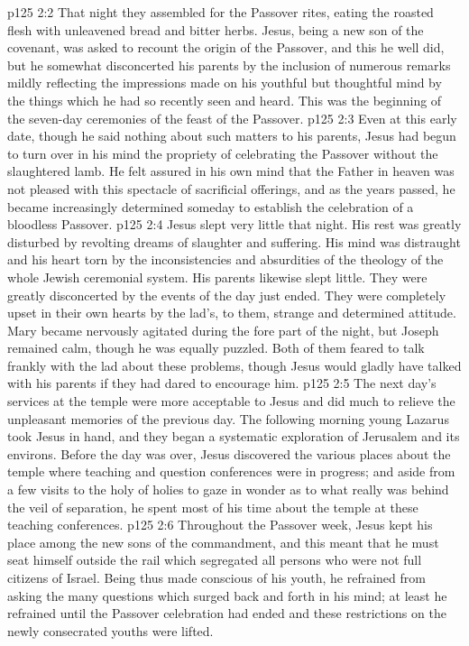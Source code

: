\vs p125 2:2 That night they assembled for the Passover rites, eating the roasted flesh with unleavened bread and bitter herbs. Jesus, being a new son of the covenant, was asked to recount the origin of the Passover, and this he well did, but he somewhat disconcerted his parents by the inclusion of numerous remarks mildly reflecting the impressions made on his youthful but thoughtful mind by the things which he had so recently seen and heard. This was the beginning of the seven\hyp{}day ceremonies of the feast of the Passover.
\vs p125 2:3 Even at this early date, though he said nothing about such matters to his parents, Jesus had begun to turn over in his mind the propriety of celebrating the Passover without the slaughtered lamb. He felt assured in his own mind that the Father in heaven was not pleased with this spectacle of sacrificial offerings, and as the years passed, he became increasingly determined someday to establish the celebration of a bloodless Passover.
\vs p125 2:4 Jesus slept very little that night. His rest was greatly disturbed by revolting dreams of slaughter and suffering. His mind was distraught and his heart torn by the inconsistencies and absurdities of the theology of the whole Jewish ceremonial system. His parents likewise slept little. They were greatly disconcerted by the events of the day just ended. They were completely upset in their own hearts by the lad’s, to them, strange and determined attitude. Mary became nervously agitated during the fore part of the night, but Joseph remained calm, though he was equally puzzled. Both of them feared to talk frankly with the lad about these problems, though Jesus would gladly have talked with his parents if they had dared to encourage him.
\vs p125 2:5 The next day’s services at the temple were more acceptable to Jesus and did much to relieve the unpleasant memories of the previous day. The following morning young Lazarus took Jesus in hand, and they began a systematic exploration of Jerusalem and its environs. Before the day was over, Jesus discovered the various places about the temple where teaching and question conferences were in progress; and aside from a few visits to the holy of holies to gaze in wonder as to what really was behind the veil of separation, he spent most of his time about the temple at these teaching conferences.
\vs p125 2:6 Throughout the Passover week, Jesus kept his place among the new sons of the commandment, and this meant that he must seat himself outside the rail which segregated all persons who were not full citizens of Israel. Being thus made conscious of his youth, he refrained from asking the many questions which surged back and forth in his mind; at least he refrained until the Passover celebration had ended and these restrictions on the newly consecrated youths were lifted.
